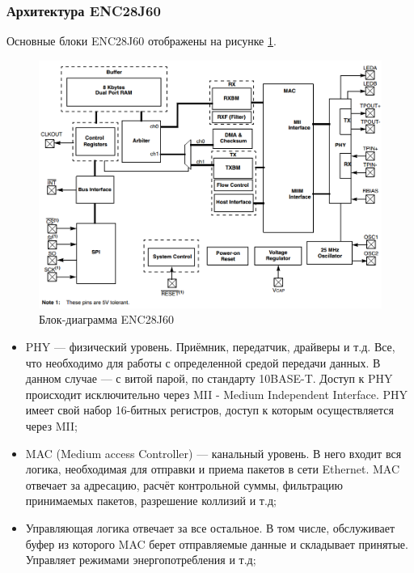\subsubsection{Архитектура ENC28J60}

Основные блоки ENC28J60 отображены на рисунке \ref{fig:encblocks}.

\begin{figure}[H]
	\centering
		\includegraphics[scale=0.5]{img/encblockdiagram.png}
	\caption{Блок-диаграмма ENC28J60\label{fig:encblocks} \cite{enc28j60datasheet}}
\end{figure}

\begin{itemize}
	\item PHY --- физический уровень. Приёмник, передатчик, драйверы и т.д. Все, что необходимо для работы с определенной средой передачи данных. В данном случае --- с витой парой, по стандарту 10BASE-T. Доступ к PHY происходит исключительно через MII - Medium Independent Interface. PHY имеет свой набор 16-битных регистров, доступ к которым осуществляется через MII;
	\item MAC (Medium access Controller) --- канальный уровень. В него входит вся логика, необходимая для отправки и приема пакетов в сети Ethernet. MAC отвечает за адресацию, расчёт контрольной суммы, фильтрацию принимаемых пакетов, разрешение коллизий и т.д;
	\item Управляющая логика отвечает за все остальное. В том числе, обслуживает буфер из которого MAC берет отправляемые данные и складывает принятые. Управляет режимами энергопотребления и т.д;
\end{itemize}

